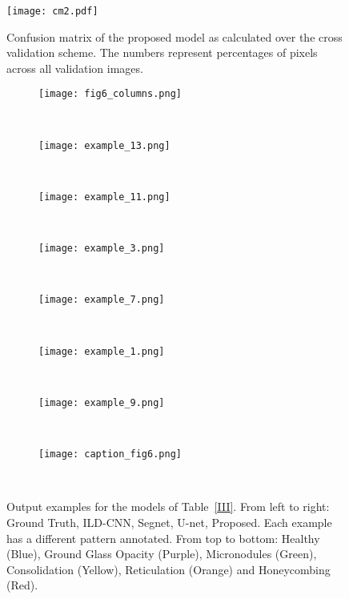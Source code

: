 \documentclass[journal]{IEEEtran}
\begin{document}
\begin{figure}
    \centering
    \texttt{[image: cm2.pdf]}
    \caption{Confusion matrix of the proposed model as calculated over the cross validation scheme. The numbers represent percentages of pixels across all validation images.}
    \label{fig:cm}
\end{figure}\begin{figure*}
    \centering
    \begin{subfigure}[b]{1\textwidth}
    	\centering
        \texttt{[image: fig6\_columns.png]}
    \end{subfigure}
    ~
    ~

    \begin{subfigure}[b]{1\textwidth}
    	\centering
        \texttt{[image: example\_13.png]}
    \end{subfigure}
    ~
    
    \begin{subfigure}[b]{1\textwidth}
    	\centering
        \texttt{[image: example\_11.png]}
    \end{subfigure}
    ~
    
    \begin{subfigure}[b]{1\textwidth}
    	\centering
        \texttt{[image: example\_3.png]}
    \end{subfigure}
    ~
    
    \begin{subfigure}[b]{1\textwidth}
    	\centering
        \texttt{[image: example\_7.png]}
    \end{subfigure}
    ~
    
    \begin{subfigure}[b]{1\textwidth}
    	\centering
        \texttt{[image: example\_1.png]}
    \end{subfigure}
    ~

    \begin{subfigure}[b]{1\textwidth}
    	\centering
        \texttt{[image: example\_9.png]}
    \end{subfigure}
    ~
    
    \begin{subfigure}[b]{1\textwidth}
    	\centering
        \texttt{[image: caption\_fig6.png]}
    \end{subfigure}
    ~
    
    \caption{Output examples for the models of Table~\ref{III}. From left to right: Ground Truth, ILD-CNN, Segnet, U-net, Proposed. Each example has a different pattern annotated. From top to bottom: Healthy (Blue), Ground Glass Opacity (Purple), Micronodules (Green), Consolidation (Yellow), Reticulation (Orange) and Honeycombing (Red).}
    \label{fig:examples}
\end{figure*}%
\end{document}
